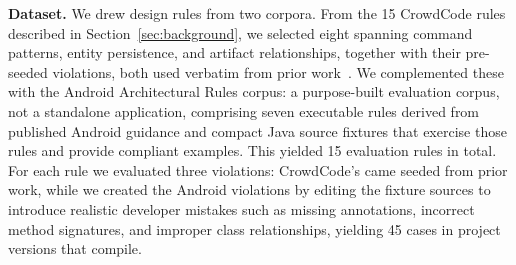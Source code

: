 \textbf{Dataset.} We drew design rules from two corpora. From the 15 CrowdCode rules described in Section~\ref{sec:background},
we selected eight spanning command patterns, entity persistence, and
artifact relationships, together with their pre-seeded violations,
both used verbatim from prior work~\cite{mehrpour2019active}.
 We
complemented these with the Android Architectural Rules corpus: a
purpose-built evaluation corpus, not a standalone application,
comprising seven executable rules derived from published Android
guidance and compact Java source fixtures that exercise those rules and
provide compliant examples. This yielded 15 evaluation rules in total.
For each rule we evaluated three violations: CrowdCode's came seeded
from prior work, while we created the Android violations by editing
the fixture sources to introduce realistic developer mistakes such as
missing annotations, incorrect method signatures, and improper class
relationships, yielding 45 cases in project versions that compile.


